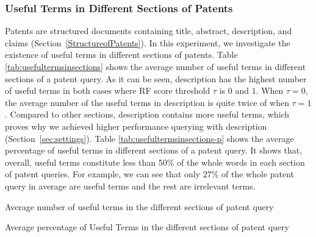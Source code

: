 \subsubsection{Useful Terms in Different Sections of Patents}
Patents are structured documents containing title, abstract, description, and claims (Section~\ref{StructureofPatents}). In this experiment, we investigate the existence of useful terms in different sections of patents. 
Table \ref{tab:usefultermsinsections} shows the average number of useful terms in different sections of a patent query.  
As it can be seen, description has the highest number of useful terms in both cases where RF score threshold $ \tau $ is $0$ and $1$. When $ \tau = 0 $, the average number of the useful terms in description is quite twice of when $ \tau = 1 $. Compared to other sections, description contains more useful terms, which proves why we achieved higher performance querying with description (Section~\ref{sec:settings}).
Table \ref{tab:usefultermsinsections-p} shows the average percentage of useful terms in different sections of a patent query. It shows that, overall, useful terms constitute less than 50\% of the whole words in each section of patent queries. For example, we can see that only 27\% of the whole patent query in average are useful terms and the rest are irrelevant terms. 

\begin{table}[t!]
  \begin{center}
   \caption{Average number of useful terms in the different sections of patent query}
     
  \label{tab:usefultermsinsections}
  \end{center}  
\end{table}
\begin{table}[t!]
  \begin{center}
   \caption{Average percentage of Useful Terms in the different sections of patent query}
     
  \label{tab:usefultermsinsections-p}
  \end{center}  
\end{table}


